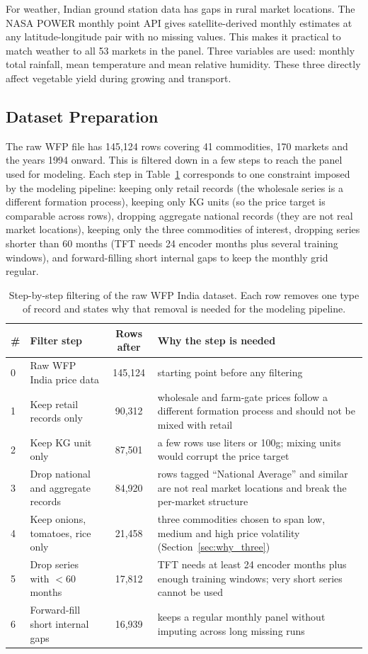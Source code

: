 \documentclass[conference,twoside]{IEEEtran}
\begin{document}
For weather, Indian ground station data has gaps in rural market locations. The NASA POWER monthly point API \cite{nasa2026power} gives satellite-derived monthly estimates at any latitude-longitude pair with no missing values. This makes it practical to match weather to all 53 markets in the panel. Three variables are used: monthly total rainfall, mean temperature and mean relative humidity. These three directly affect vegetable yield during growing and transport.

\subsection{Dataset Preparation}
The raw WFP file has 145{,}124 rows covering 41 commodities, 170 markets and the years 1994 onward. This is filtered down in a few steps to reach the panel used for modeling. Each step in Table~\ref{tab:filtering} corresponds to one constraint imposed by the modeling pipeline: keeping only retail records (the wholesale series is a different formation process), keeping only KG units (so the price target is comparable across rows), dropping aggregate national records (they are not real market locations), keeping only the three commodities of interest, dropping series shorter than 60 months (TFT needs 24 encoder months plus several training windows), and forward-filling short internal gaps to keep the monthly grid regular.

\begin{table}[!t]
\centering
\caption{Step-by-step filtering of the raw WFP India dataset. Each row removes one type of record and states why that removal is needed for the modeling pipeline.}
\label{tab:filtering}
\begin{tabular}{p{0.5cm}p{4.5cm}cp{8.5cm}}
\toprule
\textbf{\#} & \textbf{Filter step} & \textbf{Rows after} & \textbf{Why the step is needed} \\
\midrule
0 & Raw WFP India price data         & 145{,}124 & starting point before any filtering \\
1 & Keep retail records only         & 90{,}312  & wholesale and farm-gate prices follow a different formation process and should not be mixed with retail \\
2 & Keep KG unit only                & 87{,}501  & a few rows use liters or 100g; mixing units would corrupt the price target \\
3 & Drop national and aggregate records & 84{,}920  & rows tagged ``National Average'' and similar are not real market locations and break the per-market structure \\
4 & Keep onions, tomatoes, rice only & 21{,}458  & three commodities chosen to span low, medium and high price volatility (Section~\ref{sec:why_three}) \\
5 & Drop series with $<$60 months    & 17{,}812  & TFT needs at least 24 encoder months plus enough training windows; very short series cannot be used \\
6 & Forward-fill short internal gaps & 16{,}939  & keeps a regular monthly panel without imputing across long missing runs \\
\bottomrule
\end{tabular}
\end{table}
\end{document}
